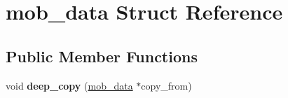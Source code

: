 \hypertarget{structmob__data}{\section{mob\-\_\-data Struct Reference}
\label{structmob__data}
}
\subsection*{Public Member Functions}
\begin{DoxyCompactItemize}
\item 
\hypertarget{structmob__data_a9ba0ac10d57af36a05154c62fe3d5312}{void {\bfseries deep\-\_\-copy} (\hyperlink{structmob__data}{mob\-\_\-data} $\ast$copy\-\_\-from)}\label{structmob__data_a9ba0ac10d57af36a05154c62fe3d5312}

\end{DoxyCompactItemize}
